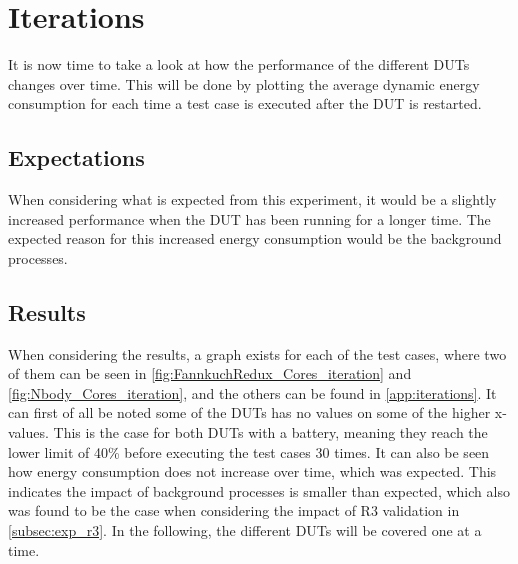 \section{Iterations}\label{sec:iterations}

It is now time to take a look at how the performance of the different DUTs changes over time. This will be done by plotting the average dynamic energy consumption for each time a test case is executed after the DUT is restarted.

\subsection{Expectations}

When considering what is expected from this experiment, it would be a slightly increased performance when the DUT has been running for a longer time. The expected reason for this increased energy consumption would be the background processes. 

\subsection{Results} 

When considering the results, a graph exists for each of the test cases, where two of them can be seen in \cref{fig:FannkuchRedux_Cores_iteration} and \cref{fig:Nbody_Cores_iteration}, and the others can be found in \cref{app:iterations}. It can first of all be noted some of the DUTs has no values on some of the higher x-values. This is the case for both DUTs with a battery, meaning they reach the lower limit of 40\% before executing the test cases 30 times. It can also be seen how energy consumption does not increase over time, which was expected. This indicates the impact of background processes is smaller than expected, which also was found to be the case when considering the impact of R3 validation in \cref{subsec:exp_r3}. In the following, the different DUTs will be covered one at a time.

